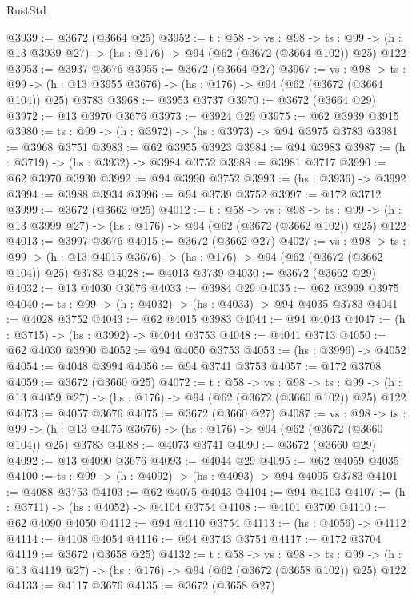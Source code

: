 \begin{lexlean}{RustStd}
\begin{coremodule}
@3939 := @3672 (@3664 @25)
@3952 := {t : @58} ->
  {vs : @98} ->
  {ts : @99} -> (h : @13 @3939 @27) -> (hs : @176) -> @94 (@62 (@3672 (@3664 @102)) @25) @122
@3953 := @3937 @3676
@3955 := @3672 (@3664 @27)
@3967 := {vs : @98} ->
  {ts : @99} -> (h : @13 @3955 @3676) -> (hs : @176) -> @94 (@62 (@3672 (@3664 @104)) @25) @3783
@3968 := @3953 @3737
@3970 := @3672 (@3664 @29)
@3972 := @13 @3970 @3676
@3973 := @3924 @29
@3975 := @62 @3939 @3915
@3980 := {ts : @99} -> (h : @3972) -> (hs : @3973) -> @94 @3975 @3783
@3981 := @3968 @3751
@3983 := @62 @3955 @3923
@3984 := @94 @3983
@3987 := (h : @3719) -> (hs : @3932) -> @3984 @3752
@3988 := @3981 @3717
@3990 := @62 @3970 @3930
@3992 := @94 @3990 @3752
@3993 := (hs : @3936) -> @3992
@3994 := @3988 @3934
@3996 := @94 @3739 @3752
@3997 := @172 @3712
@3999 := @3672 (@3662 @25)
@4012 := {t : @58} ->
  {vs : @98} ->
  {ts : @99} -> (h : @13 @3999 @27) -> (hs : @176) -> @94 (@62 (@3672 (@3662 @102)) @25) @122
@4013 := @3997 @3676
@4015 := @3672 (@3662 @27)
@4027 := {vs : @98} ->
  {ts : @99} -> (h : @13 @4015 @3676) -> (hs : @176) -> @94 (@62 (@3672 (@3662 @104)) @25) @3783
@4028 := @4013 @3739
@4030 := @3672 (@3662 @29)
@4032 := @13 @4030 @3676
@4033 := @3984 @29
@4035 := @62 @3999 @3975
@4040 := {ts : @99} -> (h : @4032) -> (hs : @4033) -> @94 @4035 @3783
@4041 := @4028 @3752
@4043 := @62 @4015 @3983
@4044 := @94 @4043
@4047 := (h : @3715) -> (hs : @3992) -> @4044 @3753
@4048 := @4041 @3713
@4050 := @62 @4030 @3990
@4052 := @94 @4050 @3753
@4053 := (hs : @3996) -> @4052
@4054 := @4048 @3994
@4056 := @94 @3741 @3753
@4057 := @172 @3708
@4059 := @3672 (@3660 @25)
@4072 := {t : @58} ->
  {vs : @98} ->
  {ts : @99} -> (h : @13 @4059 @27) -> (hs : @176) -> @94 (@62 (@3672 (@3660 @102)) @25) @122
@4073 := @4057 @3676
@4075 := @3672 (@3660 @27)
@4087 := {vs : @98} ->
  {ts : @99} -> (h : @13 @4075 @3676) -> (hs : @176) -> @94 (@62 (@3672 (@3660 @104)) @25) @3783
@4088 := @4073 @3741
@4090 := @3672 (@3660 @29)
@4092 := @13 @4090 @3676
@4093 := @4044 @29
@4095 := @62 @4059 @4035
@4100 := {ts : @99} -> (h : @4092) -> (hs : @4093) -> @94 @4095 @3783
@4101 := @4088 @3753
@4103 := @62 @4075 @4043
@4104 := @94 @4103
@4107 := (h : @3711) -> (hs : @4052) -> @4104 @3754
@4108 := @4101 @3709
@4110 := @62 @4090 @4050
@4112 := @94 @4110 @3754
@4113 := (hs : @4056) -> @4112
@4114 := @4108 @4054
@4116 := @94 @3743 @3754
@4117 := @172 @3704
@4119 := @3672 (@3658 @25)
@4132 := {t : @58} ->
  {vs : @98} ->
  {ts : @99} -> (h : @13 @4119 @27) -> (hs : @176) -> @94 (@62 (@3672 (@3658 @102)) @25) @122
@4133 := @4117 @3676
@4135 := @3672 (@3658 @27)

\end{coremodule}
\end{lexlean}

